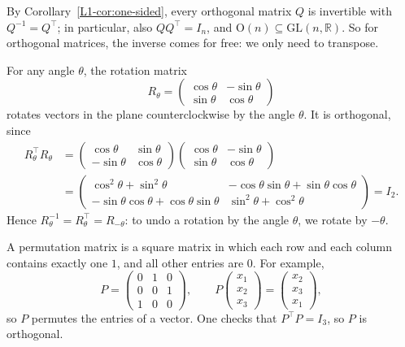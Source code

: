 By Corollary~\ref{L1-cor:one-sided}, every orthogonal matrix $Q$ is invertible with $Q^{-1} = Q^\top$; in particular, also $QQ^\top = I_n$, and $\mathrm{O}(n) \subseteq \mathrm{GL}(n, \mathbb{R})$. So for orthogonal matrices, the inverse comes for free: we only need to transpose.

\begin{example}
    For any angle $\theta$, the rotation matrix
    \[R_\theta = \begin{pmatrix}
        \cos\theta & -\sin\theta \\
        \sin\theta & \cos\theta
    \end{pmatrix}\]
    rotates vectors in the plane counterclockwise by the angle $\theta$. It is orthogonal, since
    \begin{align*}
        R_\theta^\top R_\theta &= \begin{pmatrix}
            \cos\theta & \sin\theta \\
            -\sin\theta & \cos\theta
        \end{pmatrix} \begin{pmatrix}
            \cos\theta & -\sin\theta \\
            \sin\theta & \cos\theta
        \end{pmatrix} \\
        &= \begin{pmatrix}
            \cos^2\theta + \sin^2\theta & -\cos\theta \sin\theta + \sin\theta \cos\theta \\
            -\sin\theta \cos\theta + \cos\theta \sin\theta & \sin^2\theta + \cos^2\theta
        \end{pmatrix} = I_2.
    \end{align*}
    Hence $R_\theta^{-1} = R_\theta^\top = R_{-\theta}$: to undo a rotation by the angle $\theta$, we rotate by $-\theta$.
\end{example}

\begin{example}
    A permutation matrix is a square matrix in which each row and each column contains exactly one $1$, and all other entries are $0$. For example,
    \[P = \begin{pmatrix}
        0 & 1 & 0 \\
        0 & 0 & 1 \\
        1 & 0 & 0
    \end{pmatrix}, \qquad P \begin{pmatrix}
        x_1 \\
        x_2 \\
        x_3
    \end{pmatrix} = \begin{pmatrix}
        x_2 \\
        x_3 \\
        x_1
    \end{pmatrix},\]
    so $P$ permutes the entries of a vector. One checks that $P^\top P = I_3$, so $P$ is orthogonal.
\end{example}

